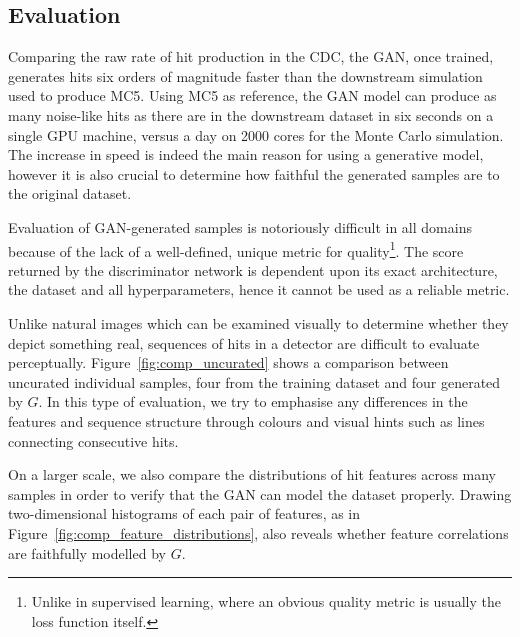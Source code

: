 



\subsection{Evaluation}
\label{sec:gan_eval}
Comparing the raw rate of hit production in the CDC, the GAN, once trained,
generates hits six orders of magnitude faster than the downstream simulation
used to produce MC5. Using MC5 as reference, the GAN model can produce as many
noise-like hits as there are in the downstream dataset in six seconds on a
single GPU machine, versus a day on 2000 cores for the Monte Carlo simulation.
The increase in speed is indeed the main reason for using a generative model,
however it is also crucial to determine how faithful the generated samples are
to the original dataset.


Evaluation of GAN-generated samples is notoriously difficult in all domains
because of the lack of a well-defined, unique metric for quality\footnote{Unlike
in supervised learning, where an obvious quality metric is usually the loss
function itself.}. The score
returned by the discriminator network is dependent upon its exact architecture,
the dataset and all hyperparameters, hence it cannot be used as a reliable metric. 

Unlike natural images which can be examined visually to determine whether
they depict something real, sequences of hits in a detector are difficult to
evaluate perceptually. 
Figure~\ref{fig:comp_uncurated} shows a comparison between uncurated individual
samples, four from the training dataset and four generated by $G$. In this type
of evaluation, we try to emphasise any differences in the features and
sequence structure through colours and visual hints such as lines connecting
consecutive hits.

On a larger scale, we also compare the distributions of hit features across many
samples in order to verify that the GAN can model the dataset properly. Drawing
two-dimensional histograms of each pair of features, as in
Figure~\ref{fig:comp_feature_distributions}, also reveals whether feature
correlations are faithfully modelled by $G$.

